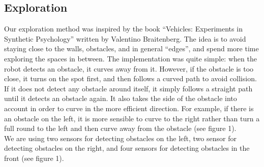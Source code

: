 \documentclass[]{article}
\begin{document}
\subsection{Exploration}
Our exploration method was inspired by the book ``Vehicles: Experiments in Synthetic Psychology'' written by Valentino Braitenberg. The idea is to avoid staying close to the walls, obstacles, and in general ``edges'', and spend more time exploring the spaces in between. The implementation was quite simple: when the robot detects an obstacle, it curves away from it. However, if the obstacle is too close, it turns on the spot first, and then follows a curved path to avoid collision. If it does not detect any obstacle around itself, it simply follows a straight path until it detects an obstacle again. It also takes the side of the obstacle into account in order to curve in the more efficient direction. For example, if there is an obstacle on the left, it is more sensible to curve to the right rather than turn a full round to the left and then curve away from the obstacle (see figure 1). \\
We are using two sensors for detecting obstacles on the left, two sensor for detecting obstacles on the right, and four sensors for detecting obstacles in the front (see figure 1). 
\end{document}
